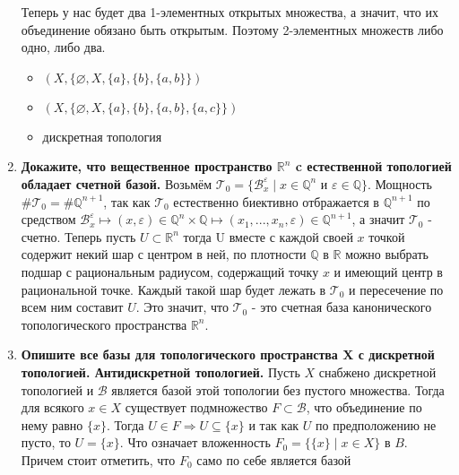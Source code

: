 \documentclass{article}
\begin{document}
\begin{enumerate}
        Теперь у нас будет два 1-элементных открытых множества, а значит, что
        их объединение обязано быть открытым. Поэтому 2-элементных множеств
        либо одно, либо два.
        \begin{itemize}
            \item $(X, \{\varnothing, X, \{a\}, \{b\}, \{a, b\}\})$
            \item $(X, \{\varnothing, X, \{a\}, \{b\}, \{a, b\}, \{a, c\}\})$
        \end{itemize}
        \begin{itemize}
            \item дискретная топология
        \end{itemize}

    \item \textbf{Докажите, что вещественное пространство $\mathbb{R}^n$ c
        естественной топологией обладает счетной базой.} Возьмём $\mathcal{T}_0
        =\{\mathcal{B}_x^\varepsilon\;|\;x\in\mathbb{Q}^n\text{ и }\varepsilon
        \in\mathbb{Q}\}$. Мощность $\#\mathcal{T}_0 = \#\mathbb{Q}^{n+1}$, так
        как $\mathcal{T}_0$ естественно биективно отбражается в $\mathbb{Q}^{n+1}$ по
        средством $\mathcal{B}_x^\varepsilon\mapsto(x,\varepsilon)\in\mathbb{Q}
        ^n\times\mathbb{Q}\mapsto(x_1, ..., x_n, \varepsilon)\in\mathbb{Q}^{n+1}$,
        а значит $\mathcal{T}_0$ - счетно. Теперь пусть $U\subset\mathbb{R}^n$
        тогда U вместе с каждой своей $x$ точкой содержит некий шар с центром в
        ней, по плотности $\mathbb{Q}$ в $\mathbb{R}$ можно выбрать подшар с
        рациональным радиусом, содержащий точку $x$ и имеющий центр в
        рациональной точке. Каждый такой шар будет лежать в $\mathcal{T}_0$ и
        пересечение по всем ним составит $U$. Это значит, что $\mathcal{T}_0$ -
        это счетная база канонического топологического пространства
        $\mathbb{R}^n$.
    \item \textbf{Опишите все базы для топологического пространства X с
        дискретной топологией. Антидискретной топологией.} Пусть $X$ снабжено
        дискретной топологией и $\mathcal{B}$ является базой этой топологии без
        пустого множества. Тогда для всякого $x\in X$ существует подмножество
        $F\subset\mathcal{B}$, что объединение по нему равно $\{x\}$. Тогда
        $U\in F \Rightarrow U\subseteq\{x\}$ и так как $U$ по предположению не
        пусто, то $U = \{x\}$. Что означает вложенность $F_0=\{\{x\}\;|\;x\in X
        \}$ в $B$. Причем стоит отметить, что $F_0$ само по себе является базой

\end{enumerate}
\end{document}
